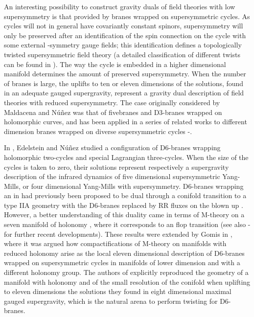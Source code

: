 \documentclass[12pt,a4paper]{article}
\begin{document}
  
An interesting possibility to construct gravity duals of field theories with low supersymmetry 
is that provided by branes wrapped on supersymmetric cycles. As cycles will not in general 
have covariantly constant spinors, supersymmetry will only be preserved after an 
identification of the spin connection on the cycle with some external \coordHE{}-symmetry gauge fields; 
this identification defines a topologically twisted supersymmetric field theory \cite{BSV} 
(a detailed classification of different twists can be found in \cite{BT}). The 
way the cycle is embedded in a higher dimensional manifold determines the amount of 
preserved supersymmetry. When the number of branes is large, the uplifts to ten or eleven 
dimensions of the solutions, found in an adequate gauged supergravity, represent a gravity dual 
description of field theories with reduced supersymmetry. The case originally considered 
by Maldacena and N\'u\~nez \cite{MN1,MN2} was that of fivebranes and D3-branes wrapped 
on holomorphic curves, and has been applied in a series of related works to different 
dimension branes wrapped on diverse supersymmetric cycles \cite{AGK}-\cite{GKPW}. 
  
In \cite{EN}, Edelstein and N\'u\~nez studied a configuration of D6-branes wrapping holomorphic 
two-cycles and special Lagrangian three-cycles. When the size of the cycles is taken to zero, 
their solutions represent respectively a supergravity description of the infrared dynamics 
of five dimensional \coordHE{} supersymmetric Yang-Mills, or four dimensional Yang-Mills with 
\coordHE{} supersymmetry. D6-branes wrapping an \coordHE{} in \coordHE{} had previously been proposed 
to be dual through a conifold transition to a type IIA geometry with the D6-branes replaced 
by RR fluxes on the blown up \coordHE{} \cite{Vafa}. However, a better understanding of this 
duality came in terms of M-theory on a seven manifold of \coordHE{} holonomy \cite{Acharya}, 
where it corresponds to an \coordHE{} flop transition \cite{AMV} (see also \cite{Rolling}-\cite{Dasgupta} 
for further recent developments). These results were extended by Gomis in 
\cite{Gomis}, where it was argued how compactifications of M-theory on manifolds with 
reduced holonomy arise as the local eleven dimensional description of D6-branes wrapped 
on supersymmetric cycles in manifolds of lower dimension and with a different holonomy group. 
The authors of \cite{EN} explicitly reproduced the geometry of a manifold with \coordHE{} holonomy and 
of the small resolution of the conifold when uplifting to eleven dimensions the solutions they found in 
eight dimensional maximal gauged supergravity, which is the natural arena to perform twisting 
for D6-branes.
  
\end{document}
